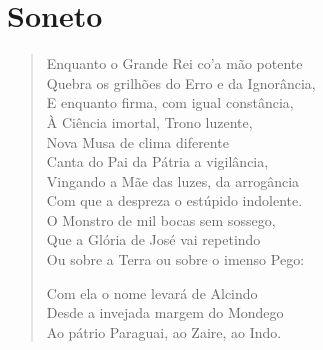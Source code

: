 \pagebreak
\oneside
\chapter{Soneto}

\begin{verse}

Enquanto o Grande Rei co'a mão potente\\
Quebra os grilhões do Erro e da Ignorância,\\			\index{\Ignor}
E enquanto firma, com igual constância,\\
À Ciência imortal, Trono luzente, \\[10pt]


Nova Musa de clima diferente\\
Canta do Pai da Pátria a vigilância,\\		\index{\Paida}
Vingando a Mãe das luzes, da arrogância\\
Com que a despreza o estúpido indolente. \\[10pt]


O Monstro de mil bocas sem sossego,\\
Que a Glória de José vai repetindo\\
Ou sobre a Terra ou sobre o imenso Pego: \\[10pt]		\index{\Pego}


Com ela o nome levará de Alcindo\\
Desde a invejada margem do Mondego\\		\index{\Monde}
Ao pátrio Paraguai, ao Zaire, ao Indo. \\[10pt]		\index{\Indo}	\index{\Parag}	\index{\Zaire}

\vspace*{2em}
\end{verse}

\twoside
